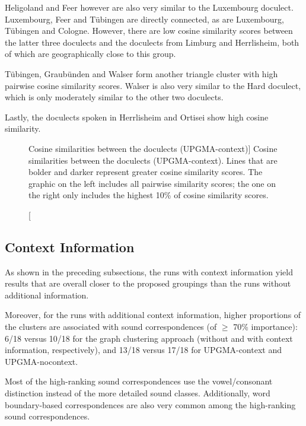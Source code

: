 \documentclass[a4paper]{article}
\begin{document}
Heligoland and Feer however are also very similar to the Luxembourg doculect.
Luxembourg, Feer and T\"{u}bingen are directly connected,
as are Luxembourg, T\"{u}bingen and Cologne.
However, there are low cosine similarity scores between
the latter three doculects and
the doculects from Limburg and Herrlisheim,
both of which are geographically close to this group.

T\"{u}bingen, Graub\"{u}nden and Walser form another
triangle cluster with high pairwise cosine similarity scores.
Walser is also very similar to the Hard doculect,
which is only moderately similar to the other two doculects.

Lastly, the doculects spoken in Herrlisheim and Ortisei
show high cosine similarity.

\begin{figure}[h]
\begin{adjustwidth}{-3cm}{-3cm}
\centering

\hspace{-7em}

\end{adjustwidth}
\caption
[Cosine similarities between the doculects (UPGMA-context)]
{
Cosine similarities between the doculects (UPGMA-context).
Lines that are bolder and darker represent greater cosine similarity scores.
The graphic on the left includes all pairwise similarity scores;
the one on the right only includes the highest 10\% of cosine similarity scores.
}
\label{fig:cosine}
\end{figure}


\subsection{Context Information}

As shown in the preceding subsections,
the runs with context information yield results
that are overall closer to the proposed groupings
than the runs without additional information.

Moreover, for the runs with additional context information,
higher proportions of the clusters are associated with
sound correspondences (of $\geq$ 70\% importance):
6/18 versus 10/18 for the graph clustering approach
(without and with context information, respectively),
and 13/18 versus 17/18 for UPGMA-context and UPGMA-nocontext.

Most of the high-ranking sound correspondences
use the vowel/consonant distinction instead of
the more detailed sound classes.
Additionally, word boundary-based correspondences are also very common
among the high-ranking sound correspondences.
\end{document}
